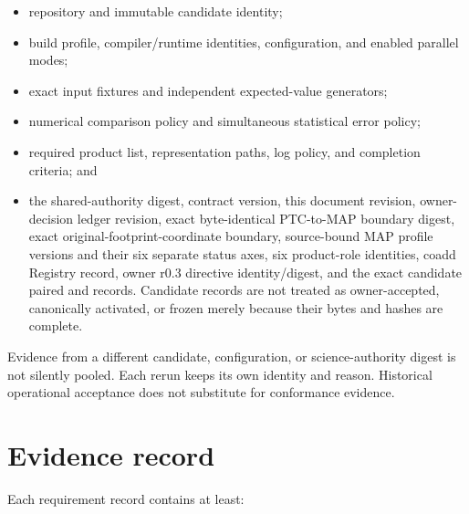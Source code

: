 \documentclass[10pt]{article}
\begin{document}
\begin{itemize}
\item repository and immutable candidate identity;
\item build profile, compiler/runtime identities, configuration, and enabled
parallel modes;
\item exact input fixtures and independent expected-value generators;
\item numerical comparison policy and simultaneous statistical error policy;
\item required product list, representation paths, log policy, and completion
criteria; and
\item the shared-authority digest, contract version, this document revision,
owner-decision ledger revision, exact byte-identical PTC-to-MAP boundary
digest, exact original-footprint-coordinate boundary, source-bound MAP
profile versions and their six separate status axes, six product-role
identities, coadd Registry record, owner r0.3 directive identity/digest, and
the exact candidate paired
\SCIMapCandidateVALRegistry{} and \SCIMapCandidateVALSourceRegister{} records.
Candidate records are not treated as owner-accepted, canonically activated, or
frozen merely because their bytes and hashes are complete.
\end{itemize}

Evidence from a different candidate, configuration, or science-authority
digest is not silently pooled. Each rerun keeps its own identity and reason.
Historical operational acceptance does not substitute for conformance
evidence.

\SCIMapLifecycleDefinition

\SCIMapLifecycleTable

\SCIMapAxisSeparationDefinition

\SCIMapAttemptOutcomeDefinition

\SCIMapCandidateProfileStatusDefinition

\section{Evidence record}

Each requirement record contains at least:
\end{document}

